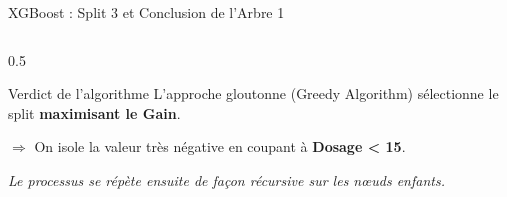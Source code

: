 \begin{frame}{XGBoost : Split 3 et Conclusion de l'Arbre 1}
\begin{columns}[T]
\begin{column}{0.5\textwidth}
            \begin{block}{Verdict de l'algorithme}
                \scriptsize
                L'approche gloutonne (Greedy Algorithm) sélectionne le split \textbf{maximisant le Gain}.
                
                $\Rightarrow$ On isole la valeur très négative en coupant à \textbf{Dosage < 15}.
                
                \vspace{0.1cm}
                \tiny \textit{Le processus se répète ensuite de façon récursive sur les nœuds enfants.}
            \end{block}
        \end{column}
    \end{columns}
\end{frame}

